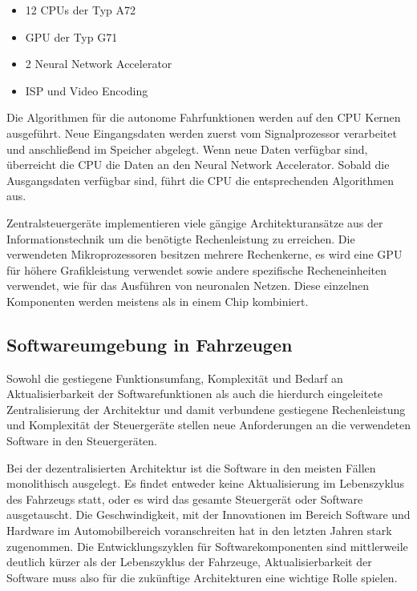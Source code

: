 \begin{itemize}
	\item 12 CPUs der Typ A72
	\item GPU der Typ G71
	\item 2 Neural Network Accelerator
	\item ISP und Video Encoding
\end{itemize}

Die Algorithmen für die autonome Fahrfunktionen werden auf den CPU Kernen ausgeführt. Neue Eingangsdaten werden zuerst vom Signalprozessor verarbeitet und anschließend im Speicher abgelegt. Wenn neue Daten verfügbar sind, überreicht die CPU die Daten an den Neural Network Accelerator. Sobald die Ausgangsdaten verfügbar sind, führt die CPU die entsprechenden Algorithmen aus. \cite{Talpes2020}

Zentralsteuergeräte implementieren viele gängige Architekturansätze aus der Informationstechnik um die benötigte Rechenleistung zu erreichen. Die verwendeten Mikroprozessoren besitzen mehrere Rechenkerne, es wird eine GPU für höhere Grafikleistung verwendet sowie andere spezifische Recheneinheiten verwendet, wie für das Ausführen von neuronalen Netzen. Diese einzelnen Komponenten werden meistens als  in einem Chip kombiniert.

\subsection{Softwareumgebung in Fahrzeugen}

Sowohl die gestiegene Funktionsumfang, Komplexität und Bedarf an Aktualisierbarkeit der Softwarefunktionen als auch die hierdurch eingeleitete Zentralisierung der  Architektur und damit verbundene gestiegene Rechenleistung und Komplexität der Steuergeräte stellen neue Anforderungen an die verwendeten Software in den Steuergeräten. 

Bei der dezentralisierten  Architektur ist die Software in den meisten Fällen monolithisch ausgelegt. Es findet entweder keine Aktualisierung im Lebenszyklus des Fahrzeugs statt, oder es wird das gesamte Steuergerät oder Software ausgetauscht. Die Geschwindigkeit,  mit der Innovationen im Bereich Software und Hardware im Automobilbereich voranschreiten hat in den letzten Jahren stark zugenommen. Die Entwicklungszyklen für Softwarekomponenten sind mittlerweile deutlich kürzer als der Lebenszyklus der Fahrzeuge, Aktualisierbarkeit der Software muss also für die zukünftige Architekturen eine wichtige Rolle spielen. \cite{Mundhenk2017} 

